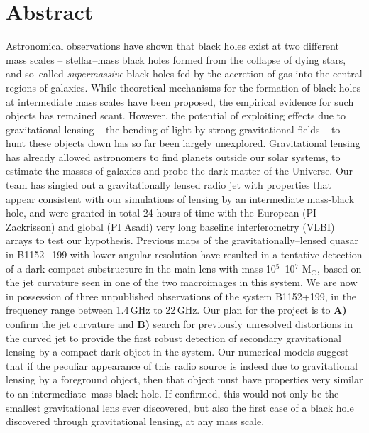 \documentclass[a4paper, 11pt]{article}
\begin{document}
\section{Abstract}
Astronomical observations have shown that black holes exist at two different mass scales -- stellar--mass black holes formed from the collapse of dying stars, and so--called {\it supermassive} black holes fed by the accretion of gas into the central regions of galaxies. While theoretical mechanisms for the formation of black holes at intermediate mass scales have been proposed, the empirical evidence for such objects has remained scant. However, the potential of exploiting effects due to gravitational lensing -- the bending of light by strong gravitational fields -- to hunt these objects down has so far been largely unexplored.
Gravitational lensing has already allowed astronomers to find planets outside our solar systems, to estimate the masses of galaxies and probe the dark matter of the Universe. Our team has singled out a gravitationally lensed radio jet with properties that appear consistent with our simulations of lensing by an intermediate mass-black hole, and were granted in total 24 hours of time with the European (PI Zackrisson) and global (PI Asadi) very long baseline interferometry (VLBI) arrays to test our hypothesis. Previous maps of the gravitationally--lensed quasar in B1152+199 with lower angular resolution have resulted in a tentative detection of a dark compact substructure in the main lens with mass 10$^5$--10$^7$ M$_\odot$, based on the jet curvature seen in one of the two macroimages in this system. We are now in possession of three unpublished observations of the system B1152+199, in the frequency range between 1.4\,GHz to 22\,GHz. Our plan for the project is to {\bf A)} confirm the jet curvature and {\bf B)} search for previously unresolved distortions in the curved jet to provide the first robust detection of secondary gravitational lensing by a compact dark object in the system. Our numerical models suggest that if the peculiar appearance of this radio source is indeed due to gravitational lensing by a foreground object, then that object must have properties very similar to an intermediate--mass black hole. If confirmed, this would not only be the smallest gravitational lens ever discovered, but also the first case of a black hole discovered through gravitational lensing, at any mass scale.
\end{document}
